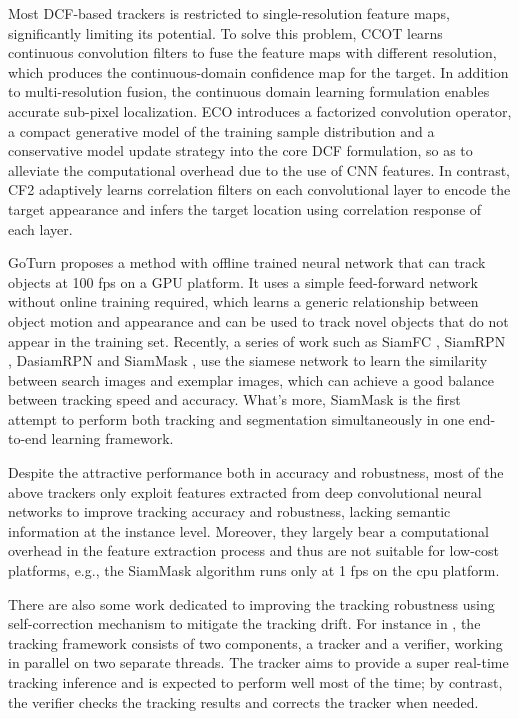 \documentclass[review]{elsarticle}
\begin{document}
\begin{CJK*}{UTF8}{gbsn}
Most DCF-based trackers is restricted to single-resolution feature maps, significantly limiting its potential. To solve this problem, CCOT \cite{Danelljan2016BeyondCF} learns continuous convolution filters to fuse the feature maps with different resolution, which produces the continuous-domain confidence map for the target. In addition to multi-resolution fusion, the continuous domain learning formulation enables accurate sub-pixel localization.
ECO \cite{Danelljan2016ECOEC} introduces a factorized convolution operator, 
a compact generative model of the training sample distribution and a conservative model update strategy into the core DCF formulation, so as to alleviate the computational overhead due to the use of CNN features.
In contrast, CF2 \cite{Ma2015HierarchicalCF} adaptively learns correlation filters on each convolutional layer to encode the target appearance and infers the target location using correlation response of each layer.

GoTurn \cite{held2016learning} proposes a method with offline trained neural network that can track objects at 100 fps on a GPU platform. It uses a simple feed-forward network without online training required, which learns a generic relationship between object motion and appearance and can be used to track novel objects that do not appear in the training set. 
Recently, a series of work such as SiamFC \cite{bertinetto2016fully}, SiamRPN \cite{Li2018HighPV},  DasiamRPN \cite{zhu2018distractor} and SiamMask \cite{Wang2018SiamMask}, use the siamese network to learn the similarity between search images and exemplar images, which can achieve a good balance between tracking speed and accuracy. What's more, SiamMask is the first attempt to perform both tracking and segmentation simultaneously in one end-to-end learning framework.

Despite the attractive performance both in accuracy and robustness, most of the above trackers only exploit features extracted from deep convolutional neural networks to improve tracking accuracy and robustness, lacking semantic information at the instance level. Moreover, they largely bear a computational overhead in the feature extraction process and thus are not suitable for low-cost platforms, e.g., the SiamMask algorithm runs only at 1 fps on the cpu platform.

There are also some work dedicated to improving the tracking robustness using self-correction mechanism to mitigate the tracking drift. For instance in \cite{fan2017parallel}, the tracking framework consists of two components, a tracker and a verifier, working in parallel on two separate threads. The tracker aims to provide a super real-time tracking inference and is expected to perform well most of the time; by contrast, the verifier checks the tracking results and corrects the tracker when needed.


\end{CJK*}
\end{document}
